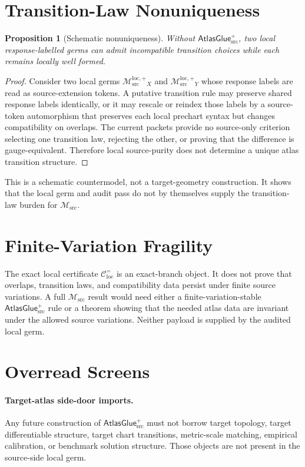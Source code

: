 \documentclass[11pt]{article}
\newcommand{\Msrc}{\mathcal{M}_{\mathrm{src}}}
\newcommand{\Mloc}{\mathcal{M}_{\mathrm{src}}^{\mathrm{loc},+}}
\newcommand{\Cexact}{\mathcal{C}^{=}_{\mathrm{loc}}}
\newcommand{\AtlasGlue}{\mathsf{AtlasGlue}_{\mathrm{src}}^{+}}
\newtheorem{proposition}{Proposition}
\begin{document}
\section{Transition-Law Nonuniqueness}

\begin{proposition}[Schematic nonuniqueness]
Without \(\AtlasGlue\), two local response-labelled germs can admit
incompatible transition choices while each remains locally well formed.
\end{proposition}

\begin{proof}
Consider two local germs \(\Mloc_X\) and \(\Mloc_Y\) whose response labels are
read as source-extension tokens. A putative transition rule may preserve
shared response labels identically, or it may rescale or reindex those labels
by a source-token automorphism that preserves each local prechart syntax but
changes compatibility on overlaps. The current packets provide no source-only
criterion selecting one transition law, rejecting the other, or proving that
the difference is gauge-equivalent. Therefore local source-purity does not
determine a unique atlas transition structure.
\end{proof}

This is a schematic countermodel, not a target-geometry construction. It
shows that the local germ and audit pass do not by themselves supply the
transition-law burden for \(\Msrc\).

\section{Finite-Variation Fragility}

The exact local certificate \(\Cexact\) is an exact-branch object. It does not
prove that overlaps, transition laws, and compatibility data persist under
finite source variations. A full \(\Msrc\) result would need either a
finite-variation-stable \(\AtlasGlue\) rule or a theorem showing that the
needed atlas data are invariant under the allowed source variations. Neither
payload is supplied by the audited local germ.

\section{Overread Screens}

\paragraph{Target-atlas side-door imports.}
Any future construction of \(\AtlasGlue\) must not borrow target topology,
target differentiable structure, target chart transitions, metric-scale
matching, empirical calibration, or benchmark solution structure. Those
objects are not present in the source-side local germ.
\end{document}
